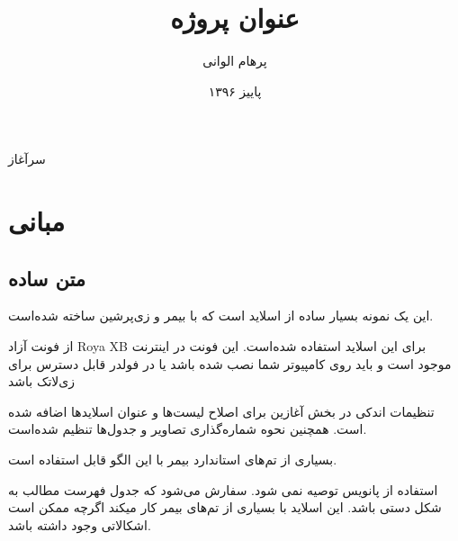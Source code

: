 \documentclass{beamer}
\title{
	عنوان پروژه
}
\subtitle{}
\author{پرهام الوانی}
\institute{دانشکده مهندسی کامپیوتر و فناوری اطلاعات}
\date{پاییز ۱۳۹۶}
\begin{document}
\begin{persian}
\begin{frame}
\maketitle
\end{frame}

\everypar{\rightskip\rightmargin}
\begin{frame}{سرآغاز}
\section{مبانی}
\subsection{متن ساده}
این یک نمونه بسیار ساده از اسلاید است که با بیمر و زی‌پرشین ساخته شده‌است.

از فونت آزاد Roya XB برای این اسلاید استفاده شده‌است. این فونت در اینترنت موجود است و باید روی کامپیوتر شما نصب شده باشد یا در فولدر قابل دسترس برای زی‌لاتک باشد

تنظیمات اندکی در بخش آغازین برای اصلاح لیست‌ها و عنوان اسلایدها اضافه شده است. همچنین نحوه شماره‌گذاری تصاویر و جدول‌ها تنظیم شده‌است.

بسیاری از تم‌های استاندارد بیمر با این الگو قابل استفاده است.

استفاده از پانویس توصیه نمی شود. سفارش می‌شود که جدول فهرست مطالب به شکل دستی باشد. این اسلاید با بسیاری از تم‌های بیمر کار میکند اگرچه ممکن است اشکالاتی وجود داشته باشد.
\end{frame}

\end{persian}
\end{document}
